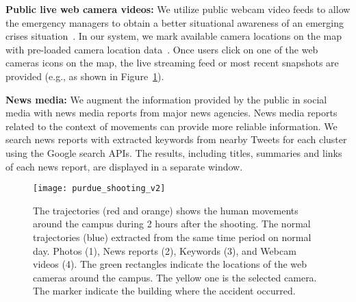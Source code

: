 \textbf{Public live web camera videos:}
We utilize public webcam video feeds to allow the emergency managers to obtain a better situational awareness of an emerging crises situation~\cite{Bergstrand:2011:VRT}.
In our system, we mark available camera locations on the map with pre-loaded camera location data~\cite{Purdue:2014:Webcam}.
Once users click on one of the web cameras icons on the map, the live streaming feed or most recent snapshots are provided (e.g., as shown in Figure~\ref{fig:purdue_shooting}).

\textbf{News media:}
We augment the information provided by the public in social media with news media reports from major news agencies.
News media reports related to the context of movements can provide more reliable information.
We search news reports with extracted keywords from nearby Tweets for each cluster using the Google search APIs.
The results, including titles, summaries and links of each news report, are displayed in a separate window.

\begin{figure}[htb]
	\centering
	\texttt{[image: purdue\_shooting\_v2]}
	\caption{	
	The trajectories (red and orange) shows the human movements around the campus during 2 hours after the shooting.
	The normal trajectories (blue) extracted from the same time period on normal day.
	Photos (1), News reports (2), Keywords (3), and Webcam videos (4).
	The green rectangles indicate the locations of the web cameras around the campus. The yellow one is the selected camera.
	The marker indicate the building where the accident occurred.
	}
	\label{fig:purdue_shooting}
\end{figure}